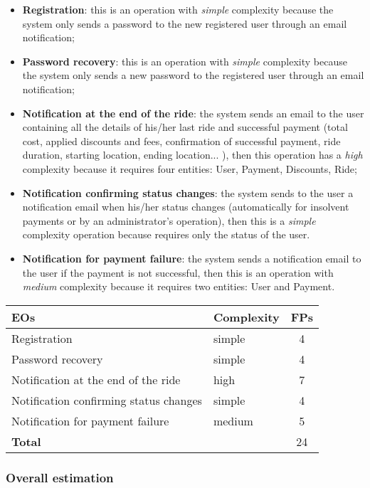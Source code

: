 \begin{itemize}
	\item \textbf{Registration}: this is an operation with \textit{simple} complexity because the system only sends a password to the new registered user through an email notification;
	\item \textbf{Password recovery}: this is an operation with \textit{simple} complexity because the system only sends a new password to the registered user through an email notification;
	\item \textbf{Notification at the end of the ride}: the system sends an email to the user containing all the details of his/her last ride and successful payment (total cost, applied discounts and fees, confirmation of successful payment, ride duration, starting location, ending location... ), then this operation has a \textit{high} complexity because it requires four entities: User, Payment, Discounts, Ride;
	\item \textbf{Notification confirming status changes}: the system sends to the user a notification email when his/her status changes (automatically for insolvent payments or by an administrator's operation), then this is a \textit{simple} complexity operation because requires only the status of the user. 
	\item \textbf{Notification for payment failure}: the system sends a notification email to the user if the payment is not successful, then this is an operation with \textit{medium} complexity because it requires two entities: User and Payment.
\end{itemize}
\begin{center}
	\begin{tabular}{|l|l|c|}
		\hline
		\textbf{EOs} 	& \textbf{Complexity} 	& \textbf{FPs} \\
		\hline
		Registration 	& simple 	& 4 \\
		Password recovery 	& simple 	& 4 \\
		Notification at the end of the ride 	& high 	& 7 \\
		Notification confirming status changes 	& simple 	& 4 \\
		Notification for payment failure 	& medium 	& 5 \\
		\hline \hline
		\textbf{Total} 	& 	& 24 \\
		\hline
	\end{tabular}
\end{center}

\subsubsection{Overall estimation}

	\todo{}
